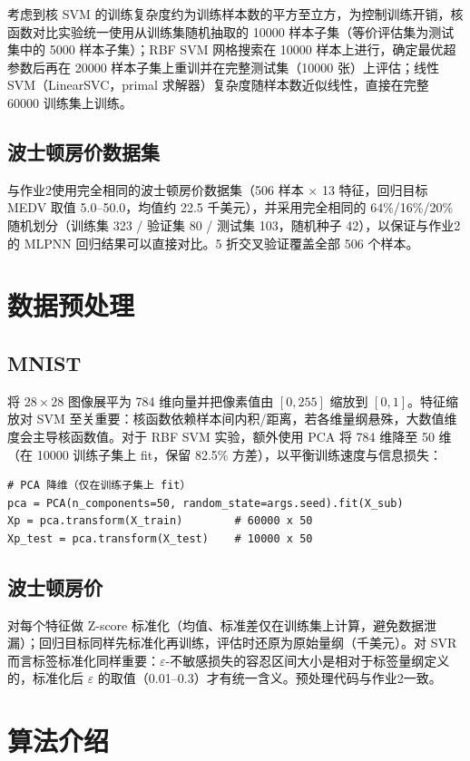 \documentclass[UTF8,zihao=-4]{ctexart}
\begin{document}
考虑到核 SVM 的训练复杂度约为训练样本数的平方至立方，为控制训练开销，核函数对比实验统一使用从训练集随机抽取的 10000 样本子集（等价评估集为测试集中的 5000 样本子集）；RBF SVM 网格搜索在 10000 样本上进行，确定最优超参数后再在 20000 样本子集上重训并在完整测试集（10000 张）上评估；线性 SVM（LinearSVC，primal 求解器）复杂度随样本数近似线性，直接在完整 60000 训练集上训练。

\subsection{波士顿房价数据集}
与作业2使用完全相同的波士顿房价数据集（506 样本 $\times$ 13 特征，回归目标 MEDV 取值 5.0--50.0，均值约 22.5 千美元），并采用完全相同的 64\%/16\%/20\% 随机划分（训练集 323 / 验证集 80 / 测试集 103，随机种子 42），以保证与作业2的 MLPNN 回归结果可以直接对比。5 折交叉验证覆盖全部 506 个样本。

\section{数据预处理}
\subsection{MNIST}
将 $28\times28$ 图像展平为 784 维向量并把像素值由 $[0,255]$ 缩放到 $[0,1]$。特征缩放对 SVM 至关重要：核函数依赖样本间内积/距离，若各维量纲悬殊，大数值维度会主导核函数值。对于 RBF SVM 实验，额外使用 PCA 将 784 维降至 50 维（在 10000 训练子集上 fit，保留 82.5\% 方差），以平衡训练速度与信息损失：

\begin{lstlisting}
# PCA 降维（仅在训练子集上 fit）
pca = PCA(n_components=50, random_state=args.seed).fit(X_sub)
Xp = pca.transform(X_train)        # 60000 x 50
Xp_test = pca.transform(X_test)    # 10000 x 50
\end{lstlisting}

\subsection{波士顿房价}
对每个特征做 Z-score 标准化（均值、标准差仅在训练集上计算，避免数据泄漏）；回归目标同样先标准化再训练，评估时还原为原始量纲（千美元）。对 SVR 而言标签标准化同样重要：$\varepsilon$-不敏感损失的容忍区间大小是相对于标签量纲定义的，标准化后 $\varepsilon$ 的取值（0.01--0.3）才有统一含义。预处理代码与作业2一致。

\section{算法介绍}
\end{document}
